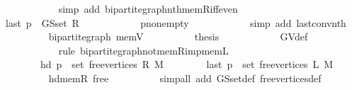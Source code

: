 \begin{isabellebody}
\ \ \ \ \ \ \ \ \ \ \isamarkupfalse%
\ {\isacharparenleft}{\kern0pt}simp\ add{\isacharcolon}{\kern0pt}\ bipartite{\isacharunderscore}{\kern0pt}graph{\isachardot}{\kern0pt}nth{\isacharunderscore}{\kern0pt}mem{\isacharunderscore}{\kern0pt}R{\isacharunderscore}{\kern0pt}iff{\isacharunderscore}{\kern0pt}even{\isacharparenright}{\kern0pt}\isanewline
\ \ \ \ \ \ \ \ \isamarkupfalse%
\ {\isachardoublequoteopen}last\ p\ {\isasymnotin}\ G{\isachardot}{\kern0pt}S{\isachardot}{\kern0pt}set\ R{\isachardoublequoteclose}\isanewline
\ \ \ \ \ \ \ \ \ \ \isamarkupfalse%
\ p{\isacharunderscore}{\kern0pt}non{\isacharunderscore}{\kern0pt}empty\isanewline
\ \ \ \ \ \ \ \ \ \ \isamarkupfalse%
\ {\isacharparenleft}{\kern0pt}simp\ add{\isacharcolon}{\kern0pt}\ last{\isacharunderscore}{\kern0pt}conv{\isacharunderscore}{\kern0pt}nth{\isacharparenright}{\kern0pt}\isanewline
\ \ \ \ \ \ \ \ \isamarkupfalse%
\ bipartite{\isacharunderscore}{\kern0pt}graph\ mem{\isacharunderscore}{\kern0pt}V{\isacharparenleft}{\kern0pt}{}{\isacharparenright}{\kern0pt}\isanewline
\ \ \ \ \ \ \ \ \isamarkupfalse%
\ {\isacharquery}{\kern0pt}thesis\isanewline
\ \ \ \ \ \ \ \ \ \ \isamarkupfalse%
\ G{\isachardot}{\kern0pt}V{\isacharunderscore}{\kern0pt}def\isanewline
\ \ \ \ \ \ \ \ \ \ \isamarkupfalse%
\ {\isacharparenleft}{\kern0pt}rule\ bipartite{\isacharunderscore}{\kern0pt}graph{\isachardot}{\kern0pt}not{\isacharunderscore}{\kern0pt}mem{\isacharunderscore}{\kern0pt}R{\isacharunderscore}{\kern0pt}imp{\isacharunderscore}{\kern0pt}mem{\isacharunderscore}{\kern0pt}L{\isacharparenright}{\kern0pt}\isanewline
\ \ \ \ \ \ \isamarkupfalse%
\isanewline
\ \ \ \ \ \ \isamarkupfalse%
\isanewline
\ \ \ \ \ \ \ \ {\isachardoublequoteopen}hd\ p\ {\isasymin}\ set\ {\isacharparenleft}{\kern0pt}free{\isacharunderscore}{\kern0pt}vertices\ R\ M{\isacharparenright}{\kern0pt}{\isachardoublequoteclose}\isanewline
\ \ \ \ \ \ \ \ {\isachardoublequoteopen}last\ p\ {\isasymin}\ set\ {\isacharparenleft}{\kern0pt}free{\isacharunderscore}{\kern0pt}vertices\ L\ M{\isacharparenright}{\kern0pt}{\isachardoublequoteclose}\isanewline
\ \ \ \ \ \ \ \ \isamarkupfalse%
\ hd{\isacharunderscore}{\kern0pt}mem{\isacharunderscore}{\kern0pt}R\ free\isanewline
\ \ \ \ \ \ \ \ \isamarkupfalse%
\ {\isacharparenleft}{\kern0pt}simp{\isacharunderscore}{\kern0pt}all\ add{\isacharcolon}{\kern0pt}\ G{\isachardot}{\kern0pt}S{\isachardot}{\kern0pt}set{\isacharunderscore}{\kern0pt}def\ free{\isacharunderscore}{\kern0pt}vertices{\isacharunderscore}{\kern0pt}def{\isacharparenright}{\kern0pt}\isanewline

\end{isabellebody}
